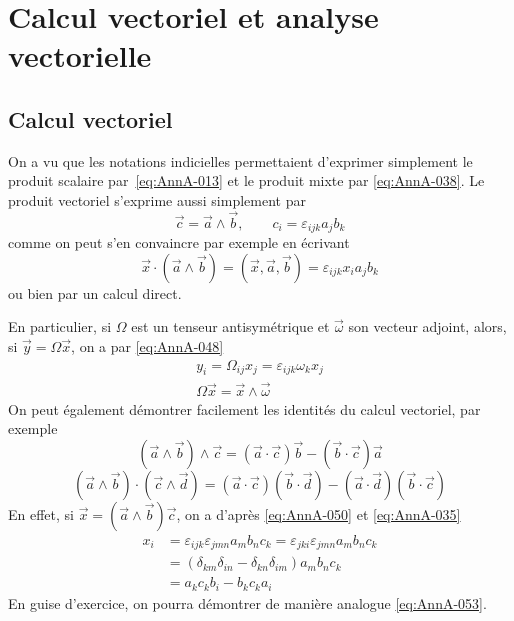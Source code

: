\section{Calcul vectoriel et analyse vectorielle}
\subsection{Calcul vectoriel}
On a vu que les notations indicielles permettaient d'exprimer simplement le produit scalaire par~\eqref{eq:AnnA-013} et le produit mixte par \eqref{eq:AnnA-038}.
Le produit vectoriel s'exprime aussi simplement par
\begin{equation}
    \vec{c} = \vec{a} \wedge \vec{b}, \qquad c_i = \varepsilon_{ijk} a_j b_k
    \label{eq:AnnA-050}
\end{equation}
comme on peut s'en convaincre par exemple en écrivant
\begin{displaymath}
    \vec{x}\cdot \left( \vec{a} \wedge \vec{b} \right) = \left( \vec{x}, \vec{a}, \vec{b} \right) = \varepsilon_{ijk} x_i a_j b_k
\end{displaymath}
ou bien par un calcul direct.

En particulier, si $\mathbb{\Omega}$ est un tenseur antisymétrique et $\vec{\omega}$ son vecteur adjoint, alors, si $\vec{y} = \mathbb{\Omega} \vec{x}$, on a par \eqref{eq:AnnA-048}
\begin{equation}
    \begin{aligned}
        y_i = \Omega_{ij} x_j = \varepsilon_{ijk} \omega_k x_j \\
        \mathbb{\Omega} \vec{x} = \vec{x} \wedge \vec{\omega}
    \end{aligned}
    \label{eq:AnnA-051}
\end{equation}
On peut également démontrer facilement les identités du calcul vectoriel, par exemple 
\begin{equation}
    \left( \vec{a} \wedge \vec{b} \right) \wedge \vec{c} = \left( \vec{a} \cdot \vec{c}  \right) \vec{b} - \left( \vec{b} \cdot \vec{c} \right) \vec{a}
    \label{eq:AnnA-052}
\end{equation}
\begin{equation}
    \left( \vec{a} \wedge \vec{b} \right) \cdot \left( \vec{c} \wedge \vec{d} \right) = \left( \vec{a} \cdot \vec{c} \right) \left( \vec{b} \cdot \vec{d} \right) - \left(  \vec{a} \cdot \vec{d} \right) \left( \vec{b} \cdot \vec{c} \right)
    \label{eq:AnnA-053}
\end{equation}
En effet, si $\vec{x} = \left( \vec{a} \wedge \vec{b} \right) \vec{c}$, on a d'après \eqref{eq:AnnA-050} et \eqref{eq:AnnA-035}
\begin{align*}
    x_i &= \varepsilon_{ijk} \varepsilon_{jmn} a_m b_n c_k = \varepsilon_{jki} \varepsilon_{jmn} a_m b_n c_k \\
    &= \left( \delta_{km} \delta_{in} - \delta_{kn} \delta_{im} \right) a_m b_n c_k \\
    &= a_k c_k b_i - b_k c_k a_i
\end{align*}
En guise d'exercice, on pourra démontrer de manière analogue \eqref{eq:AnnA-053}.
